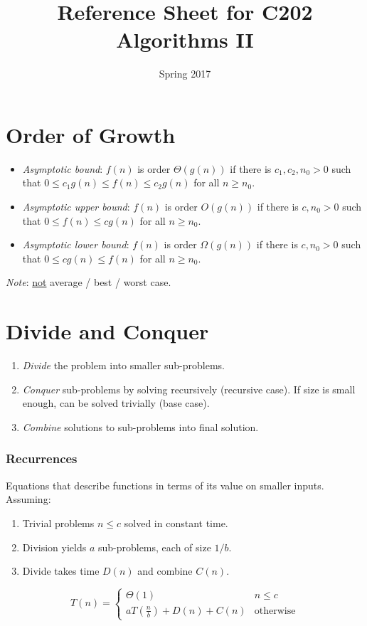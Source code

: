 \documentclass[twocolumn,english]{article}
\begin{document}
\title{Reference Sheet for C202 Algorithms II}

\date{Spring 2017}
\maketitle

\section{Order of Growth}
\begin{itemize}
\item \emph{Asymptotic bound}: $f\left(n\right)$ is order $\Theta\left(g\left(n\right)\right)$
if there is $c_{1},c_{2},n_{0}>0$ such that $0\leq c_{1}g\left(n\right)\leq f\left(n\right)\leq c_{2}g\left(n\right)$
for all $n\geq n_{0}$.
\item \emph{Asymptotic upper bound}: $f\left(n\right)$ is order $O\left(g\left(n\right)\right)$
if there is $c,n_{0}>0$ such that $0\leq f\left(n\right)\leq cg\left(n\right)$
for all $n\geq n_{0}$.
\item \emph{Asymptotic lower bound}: $f\left(n\right)$ is order $\Omega\left(g\left(n\right)\right)$
if there is $c,n_{0}>0$ such that $0\leq cg\left(n\right)\leq f\left(n\right)$
for all $n\geq n_{0}$.
\end{itemize}
\emph{Note}: \uline{not} average / best / worst case.

\section{Divide and Conquer}
\begin{enumerate}
\item \emph{Divide} the problem into smaller sub-problems.
\item \emph{Conquer} sub-problems by solving recursively (recursive case).
If size is small enough, can be solved trivially (base case).
\item \emph{Combine} solutions to sub-problems into final solution.
\end{enumerate}

\subsubsection*{Recurrences}

Equations that describe functions in terms of its value on smaller
inputs. Assuming:
\begin{enumerate}
\item Trivial problems $n\leq c$ solved in constant time.
\item Division yields $a$ sub-problems, each of size $1/b$.
\item Divide takes time $D\left(n\right)$ and combine $C\left(n\right)$.
\end{enumerate}
\[
T\left(n\right)=\begin{cases}
\Theta\left(1\right) & n\leq c\\
aT\left(\frac{n}{b}\right)+D\left(n\right)+C\left(n\right) & \text{otherwise}
\end{cases}
\]
\end{document}
